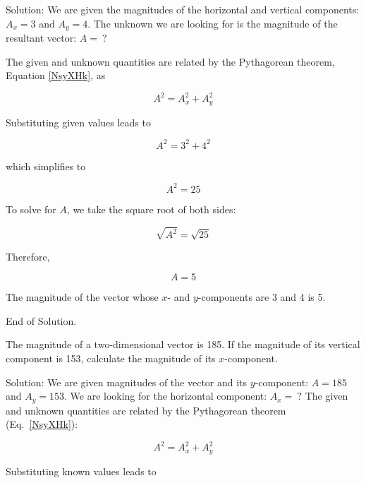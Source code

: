 \documentclass{article}
\begin{document}
Solution: We are given the magnitudes of the horizontal and vertical components: $A_x = 3$ and $A_y = 4$. The unknown we are looking for is the magnitude of the resultant vector: $A =\ ?$

\vspace{1em}

The given and unknown quantities are related by the Pythagorean theorem, Equation \eqref{NsyXHk}, as

\begin{equation*}
    A^2 = A_x^2 + A_y^2
\end{equation*}

Substituting given values leads to 

\begin{equation*}
    A^2 = 3^2 + 4^2
\end{equation*}

which simplifies to

\begin{equation*}
    A^2 = 25
\end{equation*}

To solve for $A$, we take the square root of both sides:

\begin{equation*}
    \sqrt{A^2} = \sqrt{25}
\end{equation*}

Therefore, 

\begin{equation*}
    A = 5
\end{equation*}

The magnitude of the vector whose $x$- and $y$-components are 3 and 4 is 5. 

End of Solution.

\begin{example}
    The magnitude of a two-dimensional vector is 185. If the magnitude of its vertical component is 153, calculate the magnitude of its $x$-component. 
\end{example}

Solution: We are given magnitudes of the vector and its $y$-component: $A = 185$ and $A_y = 153$. We are looking for the horizontal component: $A_x =\ ?$ The given and unknown quantities are related by the Pythagorean theorem (Eq.~\ref{NsyXHk}):

\begin{equation*}
    A^2 = A_x^2 + A_y^2
\end{equation*}

Substituting known values leads to 
\end{document}
